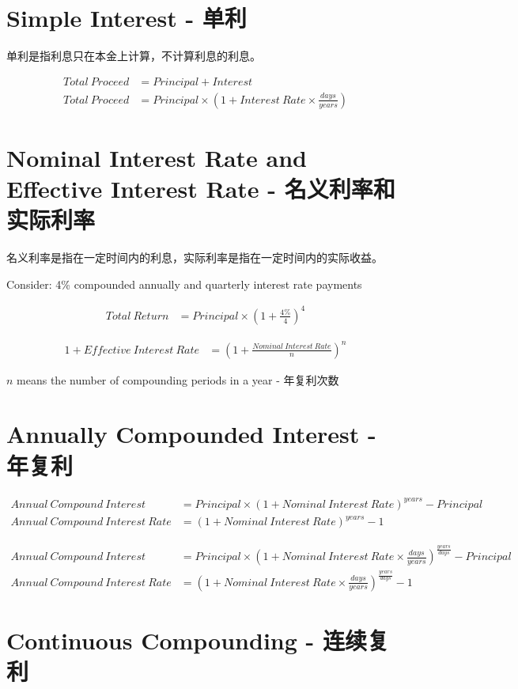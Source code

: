 \section{Simple Interest - 单利}

单利是指利息只在本金上计算，不计算利息的利息。

\[
\begin{aligned}
    Total\ Proceed &= Principal + Interest \\
    Total\ Proceed &= Principal \times \left(1 + Interest\ Rate \times \frac{days}{years}\right)
\end{aligned}
\]

\section{Nominal Interest Rate and Effective Interest Rate - 名义利率和实际利率}

名义利率是指在一定时间内的利息，实际利率是指在一定时间内的实际收益。

Consider: 4\% compounded annually and quarterly interest rate payments

\[
\begin{aligned}
    Total\ Return &= Principal \times \left(1 + \frac{4\%}{4}\right)^4
\end{aligned}
\]

\[
\begin{aligned}
    1 + Effective\ Interest\ Rate &= \left(1 + \frac{Nominal\ Interest\ Rate}{n}\right)^n
\end{aligned}
\]

$n$ means the number of compounding periods in a year - 年复利次数

\section{Annually Compounded Interest - 年复利}

\[
\begin{aligned}
    Annual\ Compound\ Interest &= Principal \times \left(1 + Nominal\ Interest\ Rate\right)^{years} - Principal \\
    Annual\ Compound\ Interest\ Rate &= \left(1 + Nominal\ Interest\ Rate\right)^{years} - 1
\end{aligned}
\]

\[
\begin{aligned}
    Annual\ Compound\ Interest &= Principal \times \left(1 + Nominal\ Interest\ Rate \times \frac{days}{years}\right)^{\frac{years}{days}} - Principal \\
    Annual\ Compound\ Interest\ Rate &= \left(1 + Nominal\ Interest\ Rate \times \frac{days}{years}\right)^{\frac{years}{days}} - 1
\end{aligned}
\]

\section{Continuous Compounding - 连续复利}

